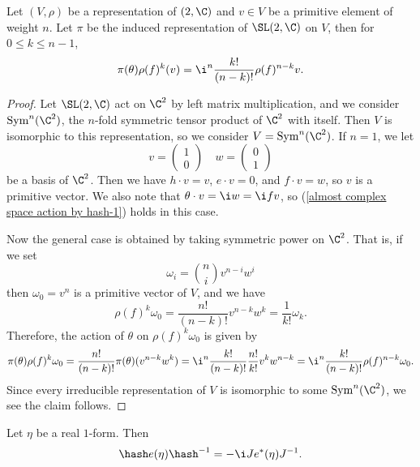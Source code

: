 \begin{lemma}\label{almost complex space action by hash}
Let $(V,\rho)$ be a representation of $\sl(2,\C)$ and $v\in V$ be a primitive element of weight $n$. Let $\pi$ be the induced representation of $\SL(2,\C)$ on $V$, then for $0\leq k\leq n-1$,
\begin{align}\label{almost complex space action by hash-1}
\pi(\theta)\rho(f)^k(v)=\i^n\frac{k!}{(n-k)!}\rho(f)^{n-k}v.
\end{align}
\end{lemma}
\begin{proof}
Let $\SL(2,\C)$ act on $\C^2$ by left matrix multiplication, and we consider $\mathrm{Sym}^n(\C^2)$, the $n$-fold symmetric tensor product of $\C^2$ with itself. Then $V$ is isomorphic to this representation, so we consider $V=\mathrm{Sym}^n(\C^2)$. If $n=1$, we let
\[v=\begin{pmatrix}
1\\
0
\end{pmatrix}\quad w=\begin{pmatrix}
0\\
1
\end{pmatrix}\]
be a basis of $\C^2$. Then we have $h\cdot v=v$, $e\cdot v=0$, and $f\cdot v=w$, so $v$ is a primitive vector. We also note that $\theta\cdot v=\i w=\i fv$, so (\ref{almost complex space action by hash-1}) holds in this case.\par
Now the general case is obtained by taking symmetric power on $\C^2$. That is, if we set
\[\omega_i=\binom{n}{i}v^{n-i}w^i\]
then $\omega_0=v^n$ is a primitive vector of $V$, and we have
\[\rho(f)^k\omega_0=\frac{n!}{(n-k)!}v^{n-k}w^k=\frac{1}{k!}\omega_k.\]
Therefore, the action of $\theta$ on $\rho(f)^k\omega_0$ is given by
\[\pi(\theta)\rho(f)^k\omega_0=\frac{n!}{(n-k)!}\pi(\theta)(v^{n-k}w^k)=\i^n\frac{k!}{(n-k)!}\frac{n!}{k!}v^kw^{n-k}=\i^n\frac{k!}{(n-k)!}\rho(f)^{n-k}\omega_0.\]
Since every irreducible representation of $V$ is isomorphic to some $\mathrm{Sym}^n(\C^2)$, we see the claim follows.
\end{proof}
\begin{lemma}\label{almost complex space conjugate by hash}
Let $\eta$ be a real $1$-form. Then
\begin{align}\label{almost complex space conjugate by hash-1}
\hash e(\eta)\hash^{-1}=-\i Je^*(\eta)J^{-1}.
\end{align}
\end{lemma}
